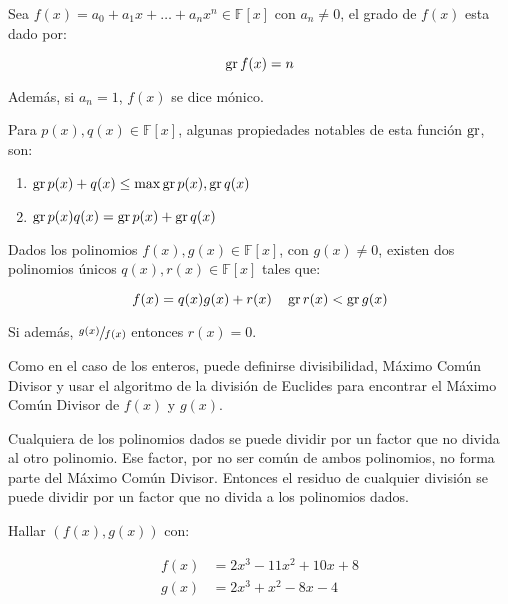         \begin{definicion}
            Sea $f(x) = a_0 + a_1 x + \dots + a_n x^n \in \mathbb{F}[x]$ con $a_n \ne 0$, el grado de $f(x)$ esta dado por:

            \begin{equation}
                \operatorname{gr}{f(x)} = n
            \end{equation}

            Además, si $a_n = 1$, $f(x)$ se dice mónico.

            Para $p(x), q(x) \in \mathbb{F}[x]$, algunas propiedades notables de esta función $\operatorname{gr}$, son:

            \begin{enumerate}
                \item $\operatorname{gr}{p(x) + q(x)} \leq \max{\operatorname{gr}{p(x)}, \operatorname{gr}{q(x)}}$
                \item $\operatorname{gr}{p(x)q(x)} = \operatorname{gr}{p(x)} + \operatorname{gr}{q(x)}$
            \end{enumerate}
        \end{definicion}

        \begin{observacion}
            Dados los polinomios $f(x), g(x) \in \mathbb{F}[x]$, con $g(x) \ne 0$, existen dos polinomios únicos $q(x), r(x) \in \mathbb{F}[x]$ tales que:

            \begin{equation}
                f(x) = q(x) g(x) + r(x) \quad \operatorname{gr}{r(x)} < \operatorname{gr}{g(x)}
            \end{equation}

            Si además, $\sfrac{g(x)}{f(x)}$ entonces $r(x) = 0$.

            Como en el caso de los enteros, puede definirse divisibilidad, Máximo Común Divisor y usar el algoritmo de la división de Euclides para encontrar el Máximo Común Divisor de $f(x)$ y $g(x)$.

            Cualquiera de los polinomios dados se puede dividir por un factor que no divida al otro polinomio.
            Ese factor, por no ser común de ambos polinomios, no forma parte del Máximo Común Divisor.
            Entonces el residuo de cualquier división se puede dividir por un factor que no divida a los polinomios dados.
        \end{observacion}

        \begin{ejemplo}
            Hallar $(f(x), g(x))$ con:

            \begin{align*}
                f(x) &= 2 x^3 - 11 x^2 + 10 x + 8 \\
                g(x) &= 2 x^3 + x^2 - 8 x - 4
            \end{align*}

        \end{ejemplo}

